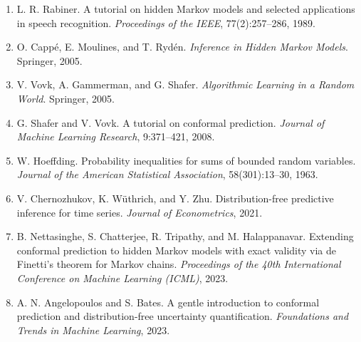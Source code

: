 \documentclass{article}
\begin{document}


{\small

\begin{enumerate}

\item L. R. Rabiner. 
A tutorial on hidden Markov models and selected applications in speech recognition. 
\textit{Proceedings of the IEEE}, 77(2):257--286, 1989.

\item O. Cappé, E. Moulines, and T. Rydén. 
\textit{Inference in Hidden Markov Models}. 
Springer, 2005.

\item V. Vovk, A. Gammerman, and G. Shafer. 
\textit{Algorithmic Learning in a Random World}. 
Springer, 2005.

\item G. Shafer and V. Vovk. 
A tutorial on conformal prediction. 
\textit{Journal of Machine Learning Research}, 9:371--421, 2008.

\item W. Hoeffding. 
Probability inequalities for sums of bounded random variables. 
\textit{Journal of the American Statistical Association}, 58(301):13--30, 1963.

\item V. Chernozhukov, K. Wüthrich, and Y. Zhu. 
Distribution-free predictive inference for time series. 
\textit{Journal of Econometrics}, 2021.

\item B. Nettasinghe, S. Chatterjee, R. Tripathy, and M. Halappanavar. 
Extending conformal prediction to hidden Markov models with exact validity via de Finetti’s theorem for Markov chains. 
\textit{Proceedings of the 40th International Conference on Machine Learning (ICML)}, 2023.

\item A. N. Angelopoulos and S. Bates. 
A gentle introduction to conformal prediction and distribution-free uncertainty quantification. 
\textit{Foundations and Trends in Machine Learning}, 2023.

\end{enumerate}

}
\end{document}
